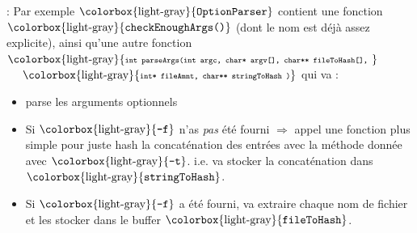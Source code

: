 \documentclass{beamer}
\newcommand{\sn}{\secname}
\newcommand{\ssn}{\subsecname}
\newcommand{\code}[1]{$\mbox{\colorbox{light-gray}{\texttt{#1}}}$}
\begin{document}
\begin{frame}{\sn : \ssn}
    Par exemple \code{OptionParser} contient une fonction \code{checkEnoughArgs()}  (dont le nom est déjà assez explicite), ainsi qu'une autre fonction \code{\scriptsize  int parseArgs(int argc, char* argv[], char** fileToHash[], }\\
    \indent $\quad$ \code{\scriptsize int* fileAmnt, char** stringToHash   )}
    qui va :
    \begin{itemize}
        \item parse les arguments optionnels\\
        \vspace{0.1cm}
        
        \item Si \code{-f} n'as \textit{pas} été fourni $\Rightarrow$ appel une fonction plus simple pour juste hash la concaténation des entrées avec la méthode donnée avec \code{-t}. i.e. va stocker la concaténation dans 
        \code{stringToHash}.\\
        \vspace{0.1cm}
        
        \item Si \code{-f} a été fourni, va extraire chaque nom de fichier et les stocker dans le buffer \code{fileToHash}.
        \vspace{0.1cm}
        
    \end{itemize}


\end{frame}
\end{document}
